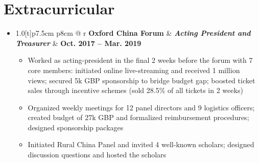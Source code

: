 \documentclass[11pt,a4paper,extrafontsizes,twoside]{memoir}
\makeatletter
\newcommand{\resumeItem}[1]{
  \item\small{
    {#1 \vspace{-2pt}}
  }
}
\newcommand{\resumeSubheading}[3]{
  \vspace{-2pt}\item
    \begin{tabular*}{1.0\textwidth}[t]{p{7.5cm} p{8cm} @{\extracolsep{\fill}} r}
      \textbf{\color{emph}#1} & \textbf{\textit{\color{emph}\small#3}} & \textbf{\footnotesize #2} \\
    \end{tabular*}\vspace{-7pt}
}
\newcommand{\resumeSubHeadingListStart}{\begin{itemize}[leftmargin=0.0in, label={}]}
\newcommand{\resumeSubHeadingListEnd}{\end{itemize}}
\newcommand{\resumeItemListStart}{\begin{itemize}}
\newcommand{\resumeItemListEnd}{\end{itemize}\vspace{-5pt}}
\makeatother
\begin{document}
\section{Extracurricular}
  \resumeSubHeadingListStart
    \resumeSubheading
      {Oxford China Forum}{Oct. 2017 -- Mar. 2019}
      {Acting President and Treasurer}
      \resumeItemListStart
        \resumeItem{Worked as acting-president in the final 2 weeks before the forum with 7 core members: initiated online live-streaming and received 1 million views; secured 5k GBP sponsorship to bridge budget gap; boosted ticket sales through incentive schemes (sold 28.5\% of all tickets in 2 weeks)}
        \resumeItem{Organized weekly meetings for 12 panel directors and 9 logistics officers; created budget of 27k GBP and formalized reimbursement procedures; designed sponsorship packages}
        \resumeItem{Initiated Rural China Panel and invited 4 well-known scholars; designed discussion questions and hosted the scholars}
      \resumeItemListEnd
  \resumeSubHeadingListEnd
  \vspace{5pt}


\begin{parcolumns}[colwidths={1=0.6\textwidth}]{2}

\end{parcolumns}

\vspace{-16pt}
\end{document}
